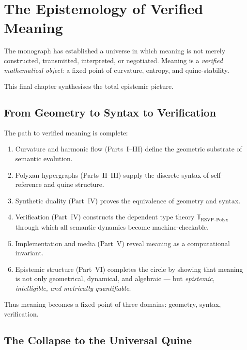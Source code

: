 \chapter{The Epistemology of Verified Meaning}
\label{ch:epistemology-of-verified-meaning}

The monograph has established a universe in which meaning is not merely
constructed, transmitted, interpreted, or negotiated.
Meaning is a \emph{verified mathematical object}:
a fixed point of curvature, entropy, and quine-stability.

This final chapter synthesises the total epistemic picture.

\section{From Geometry to Syntax to Verification}

The path to verified meaning is complete:

\begin{enumerate}
\item Curvature and harmonic flow (Parts~I--III)  
 define the geometric substrate of semantic evolution.

\item Polyxan hypergraphs (Parts~II--III)  
 supply the discrete syntax of self-reference and quine structure.

\item Synthetic duality (Part~IV)  
 proves the equivalence of geometry and syntax.

\item Verification (Part~IV)  
 constructs the dependent type theory $\mathbb{T}_{\mathrm{RSVP\text{--}Polyx}}$  
 through which all semantic dynamics become machine-checkable.

\item Implementation and media (Part~V)  
 reveal meaning as a computational invariant.

\item Epistemic structure (Part~VI)  
 completes the circle by showing that meaning is not only geometrical,
 dynamical, and algebraic —  
 but \emph{epistemic, intelligible, and metrically quantifiable}.
\end{enumerate}

Thus meaning becomes a fixed point of three domains:
geometry, syntax, verification.

\section{The Collapse to the Universal Quine}

